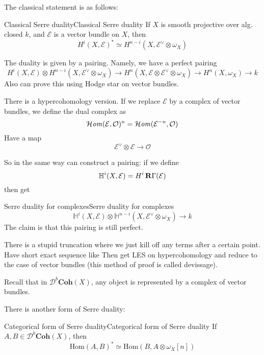 The classical statement is as follows:

\begin{proposition}{Classical Serre duality}{Classical Serre duality}
    If $X$ is smooth projective over alg. closed $k$, and $\mathcal{E}$ is a vector bundle on $X$, then $$H^i(X,\mathcal{E})^*\simeq H^{n-i}(X, \mathcal{E}^\lor\otimes \omega_{X})$$
\end{proposition}

The duality is given by a pairing. Namely, we have a perfect pairing$$H^i(X,\mathcal{E})\otimes H^{n-i}(X,\mathcal{E}^\lor\otimes \omega_{X})\xrightarrow{}H^n(X, \mathcal{E}\otimes \mathcal{E}^\lor\otimes \omega_{X})\xrightarrow{}H^n(X, \omega_{X})\xrightarrow{}k$$
Also can prove this using Hodge star on vector bundles.

There is a hypercohomology version. If we replace $\mathcal{E}$ by a complex of vector bundles, we define the dual complex as $$\operatorname{\mathcal{H}\mathit{om}}(\mathcal{E},\mathcal{O})^n=\operatorname{\mathcal{H}\mathit{om}}(\mathcal{E}^{-n}, \mathcal{O})$$Have a map $$\mathcal{E}^\lor \otimes \mathcal{E}\xrightarrow{}\mathcal{O}$$


So in the same way can construct a pairing: if we define $$\mathbb{H}^i(X,\mathcal{E})=H^i\operatorname{\mathbf{R}\Gamma}(\mathcal{E)}$$ then get 

\begin{proposition}{Serre duality for complexes}{Serre duality for complexes}
        $$\mathbb{H}^i(X,\mathcal{E})\otimes \mathbb{H}^{n-i}(X, \mathcal{E}^\lor \otimes \omega_{X})\xrightarrow{}k$$
The claim is that this pairing is still perfect.
\end{proposition}

There is a stupid truncation where we just kill off any terms after a certain point. Have short exact sequence like %
Then get LES on hypercohomology and reduce to the case of vector bundles (this method of proof is called devissage).

Recall that in $\mathcal{D}^b\mathbf{Coh}(X)$, any object is represented by a complex of vector bundles. 

There is another form of Serre duality:

\begin{proposition}{Categorical form of Serre duality}{Categorical form of Serre duality}
    If $A,B\in \mathcal{D}^b\mathbf{Coh}(X)$, then $$\mathrm{Hom}(A,B)^*\simeq \mathrm{Hom}(B,A\otimes \omega_{X}[n])$$
\end{proposition}

